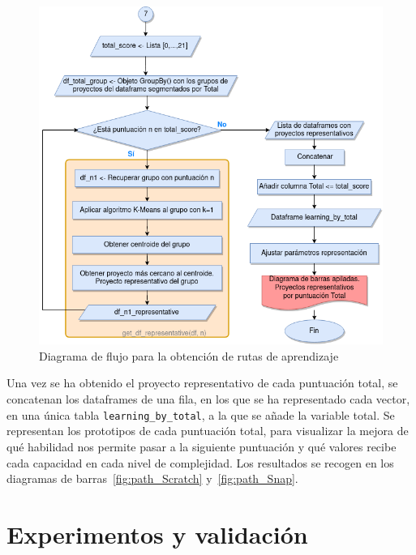 \documentclass[a4paper, 12pt]{book}
\begin{document}
\begin{figure}
    \centering
    \includegraphics[height=.6\textheight]{img/ruta_de_aprendizajeCaja.png}
    \caption{Diagrama de flujo para la obtención de rutas de aprendizaje}\label{fig:diagrama_rutas}
\end{figure}

Una vez se ha obtenido el proyecto representativo de cada puntuación total, se concatenan los dataframes de una fila, en los que se ha representado cada vector, en una única tabla \texttt{learning\_by\_total}, a la que se añade la variable total. Se representan los prototipos de cada puntuación total, para visualizar la mejora de qué habilidad nos permite pasar a la siguiente puntuación y qué valores recibe cada capacidad en cada nivel de complejidad. Los resultados se recogen en los diagramas de barras~\ref{fig:path_Scratch} y~\ref{fig:path_Snap}.


\cleardoublepage
\chapter{Experimentos y validación}
\label{chap:experimentos}
\end{document}
